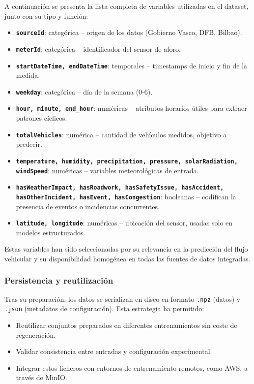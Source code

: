 A continuación se presenta la lista completa de variables utilizadas en el dataset, junto con su tipo y función:

\begin{itemize}
	\item \textbf{\texttt{sourceId}}: categórica – origen de los datos (Gobierno Vasco, DFB, Bilbao).
	\item \textbf{\texttt{meterId}}: categórica – identificador del sensor de aforo.
	\item \textbf{\texttt{startDateTime, endDateTime}}: temporales – timestamps de inicio y fin de la medida.
	\item \textbf{\texttt{weekday}}: categórica – día de la semana (0-6).
	\item \textbf{\texttt{hour, minute, end\_hour}}: numéricas – atributos horarios útiles para extraer patrones cíclicos.
	\item \textbf{\texttt{totalVehicles}}: numérica – cantidad de vehículos medidos, objetivo a predecir.
	\item \textbf{\texttt{temperature, humidity, precipitation, pressure, solarRadiation, windSpeed}}: numéricas – variables meteorológicas de entrada.
	\item \textbf{\texttt{hasWeatherImpact, hasRoadwork, hasSafetyIssue, hasAccident, hasOtherIncident, hasEvent, hasCongestion}}: booleanas – codifican la presencia de eventos o incidencias concurrentes.
	\item \textbf{\texttt{latitude, longitude}}: numéricas – ubicación del sensor, usadas solo en modelos estructurados.
\end{itemize}

Estas variables han sido seleccionadas por su relevancia en la predicción del flujo vehicular y su disponibilidad homogénea en todas las fuentes de datos integradas.

\subsubsection*{Persistencia y reutilización}

Tras su preparación, los datos se serializan en disco en formato \texttt{.npz} (datos) y \texttt{.json} (metadatos de configuración). Esta estrategia ha permitido:

\begin{itemize}
	\item Reutilizar conjuntos preparados en diferentes entrenamientos sin coste de regeneración.
	\item Validar consistencia entre entradas y configuración experimental.
	\item Integrar estos ficheros con entornos de entrenamiento remotos, como AWS, a través de MinIO.
\end{itemize}

